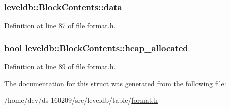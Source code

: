 \hypertarget{structleveldb_1_1_block_contents_aa30fe6388fe0f89d5565f6bae788c28e}{}
\subsubsection[{data}]{ leveldb\+::\+Block\+Contents\+::data}\label{structleveldb_1_1_block_contents_aa30fe6388fe0f89d5565f6bae788c28e}


Definition at line 87 of file format.\+h.

\hypertarget{structleveldb_1_1_block_contents_a0d4390fa3d4041ac5a3da51cbb16e315}{}
\subsubsection[{heap\+\_\+allocated}]{\setlength{\rightskip}{0pt plus 5cm}bool leveldb\+::\+Block\+Contents\+::heap\+\_\+allocated}\label{structleveldb_1_1_block_contents_a0d4390fa3d4041ac5a3da51cbb16e315}


Definition at line 89 of file format.\+h.



The documentation for this struct was generated from the following file\+:\begin{DoxyCompactItemize}
\item 
/home/dev/ds-\/160209/src/leveldb/table/\hyperlink{format_8h}{format.\+h}\end{DoxyCompactItemize}

